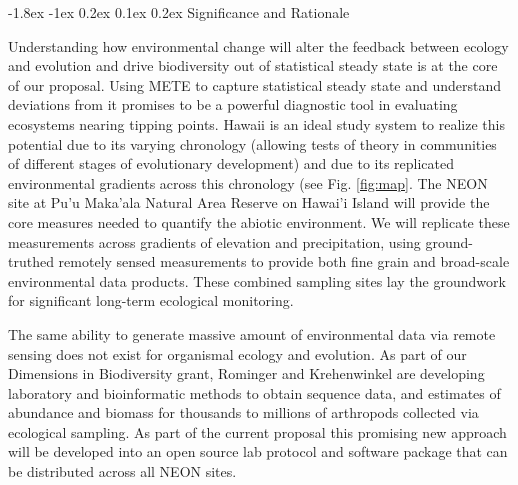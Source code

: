 \documentclass[11pt]{article}
\makeatletter
\renewcommand\subsection{\@startsection{subsection}{1}{\z@}%
                                  {-1.8ex \@plus -1ex \@minus 0.2ex}%
                                  {0.1ex \@plus 0.2ex}%
                                  {\normalfont\large\bfseries}}
\makeatother
\begin{document}
\subsection{Significance and Rationale}

Understanding how environmental change will alter the feedback between
ecology and evolution and drive biodiversity out of statistical steady
state is at the core of our proposal.  Using METE to capture
statistical steady state and understand deviations from it promises to
be a powerful diagnostic tool in evaluating ecosystems nearing tipping
points.  Hawaii is an ideal study system to realize this potential due
to its varying chronology (allowing tests of theory in communities of
different stages of evolutionary development) and due to its
replicated environmental gradients across this chronology (see
Fig. \ref{fig:map}. The NEON site at Pu'u Maka'ala Natural Area Reserve
on Hawai'i Island will provide the core measures needed to quantify
the abiotic environment.  We will replicate these measurements across
gradients of elevation and precipitation, using ground-truthed
remotely sensed measurements to provide both fine grain and
broad-scale environmental data products.  These combined sampling
sites lay the groundwork for significant long-term ecological
monitoring.

The same ability to generate massive amount of environmental data via
remote sensing does not exist for organismal ecology and evolution.
As part of our Dimensions in Biodiversity grant, Rominger and
Krehenwinkel are developing laboratory and bioinformatic methods to
obtain sequence data, and estimates of abundance and biomass for
thousands to millions of arthropods collected via ecological sampling.
As part of the current proposal this promising new approach will be
developed into an open source lab protocol and software package that
can be distributed across all NEON sites.
\end{document}
